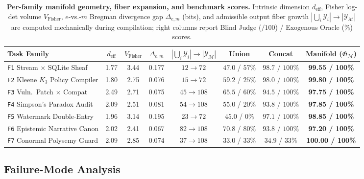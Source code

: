 \documentclass[11pt]{article}
\theoremstyle{definition}
\theoremstyle{plain}
\newcommand{\Ycal}{\mathcal{Y}}
\newcommand{\Mcal}{\mathcal{M}}
\newcommand{\Gfrak}{\mathfrak{G}}
\begin{document}
\begin{table}[t]
\centering
\caption{\textbf{Per-family manifold geometry, fiber expansion, and benchmark scores.} Intrinsic dimension $d_{\mathrm{eff}}$, Fisher log-det volume $V_{\mathrm{Fisher}}$, $e$-vs.-$m$ Bregman divergence gap $\Delta_{e,m}$ (bits), and admissible output fiber growth $|\bigcup_i \Ycal_i| \to |\Ycal_{\Mcal}|$ are computed mechanically during compilation; right columns report Blind Judge ($/100$) / Exogenous Oracle ($\%$) scores.}
\label{tab:per-family}
\vspace{4pt}
\footnotesize
\setlength{\tabcolsep}{0pt}
\begin{tabular*}{\textwidth}{@{\extracolsep{\fill}}lccccccc@{}}
\toprule
\textbf{Task Family} & $d_{\mathrm{eff}}$ & $V_{\mathrm{Fisher}}$ & $\Delta_{e,m}$ & $|\bigcup_i \Ycal_i| \!\to\! |\Ycal_{\Mcal}|$ & \textbf{Union} & \textbf{Concat} & \textbf{Manifold ($\Gfrak_{\Mcal}$)} \\
\midrule
\texttt{F1} Stream $\times$ SQLite Sheaf     & 1.77 & 3.44 & 0.177 & $12 \to 72$  & $47.0$ / $57\%$ & $98.7$ / $100\%$ & \textbf{99.55 / 100\%} \\
\texttt{F2} Kleene $K_3$ Policy Compiler     & 1.80 & 2.75 & 0.076 & $15 \to 72$  & $59.2$ / $25\%$ & $98.0$ / $100\%$ & \textbf{99.80 / 100\%} \\
\texttt{F3} Vuln.\ Patch $\times$ Compat     & 2.49 & 2.71 & 0.075 & $45 \to 108$ & $65.5$ / $60\%$ & $94.5$ / $100\%$ & \textbf{97.75 / 100\%} \\
\texttt{F4} Simpson's Paradox Audit          & 2.09 & 2.51 & 0.081 & $54 \to 108$ & $55.0$ / $20\%$ & $93.8$ / $100\%$ & \textbf{97.85 / 100\%} \\
\texttt{F5} Watermark Double-Entry           & 1.96 & 3.14 & 0.195 & $23 \to 72$  & $45.0$ / $0\%$  & $97.1$ / $100\%$ & \textbf{98.85 / 100\%} \\
\texttt{F6} Epistemic Narrative Canon        & 2.02 & 2.41 & 0.067 & $82 \to 108$ & $70.8$ / $80\%$ & $93.8$ / $100\%$ & \textbf{97.20 / 100\%} \\
\texttt{F7} Conormal Polysemy Guard          & 2.09 & 2.85 & 0.074 & $37 \to 108$ & $33.0$ / $33\%$ & $34.9$ / $33\%$  & \textbf{100.00 / 100\%} \\
\bottomrule
\end{tabular*}
\end{table}

\subsection{Failure-Mode Analysis}
\label{subsec:failure-modes}
\end{document}
